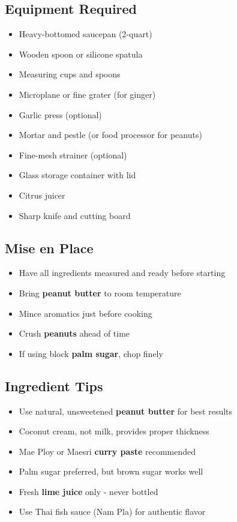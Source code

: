 \documentclass[11pt,letterpaper]{article}
\begin{document}
{\small
\setlength{\columnsep}{20pt}
\setlength{\multicolsep}{6pt}
\begin{multicols}{2}
\setlength{\parindent}{0pt}
\setlength{\parskip}{4pt}

\subsection*{Equipment Required}
\begin{itemize}
    \item Heavy-bottomed saucepan (2-quart)
    \item Wooden spoon or silicone spatula
    \item Measuring cups and spoons
    \item Microplane or fine grater (for ginger)
    \item Garlic press (optional)
    \item Mortar and pestle (or food processor for peanuts)
    \item Fine-mesh strainer (optional)
    \item Glass storage container with lid
    \item Citrus juicer
    \item Sharp knife and cutting board
\end{itemize}

\subsection*{Mise en Place}
\begin{itemize}
    \item Have all ingredients measured and ready before starting
    \item Bring \textbf{peanut butter} to room temperature
    \item Mince aromatics just before cooking
    \item Crush \textbf{peanuts} ahead of time
    \item If using block \textbf{palm sugar}, chop finely
\end{itemize}

\subsection*{Ingredient Tips}
\begin{itemize}
    \item Use natural, unsweetened \textbf{peanut butter} for best results
    \item Coconut cream, not milk, provides proper thickness
    \item Mae Ploy or Maesri \textbf{curry paste} recommended
    \item Palm sugar preferred, but brown sugar works well
    \item Fresh \textbf{lime juice} only - never bottled
    \item Use Thai fish sauce (Nam Pla) for authentic flavor
\end{itemize}


\end{multicols}}
\end{document}

